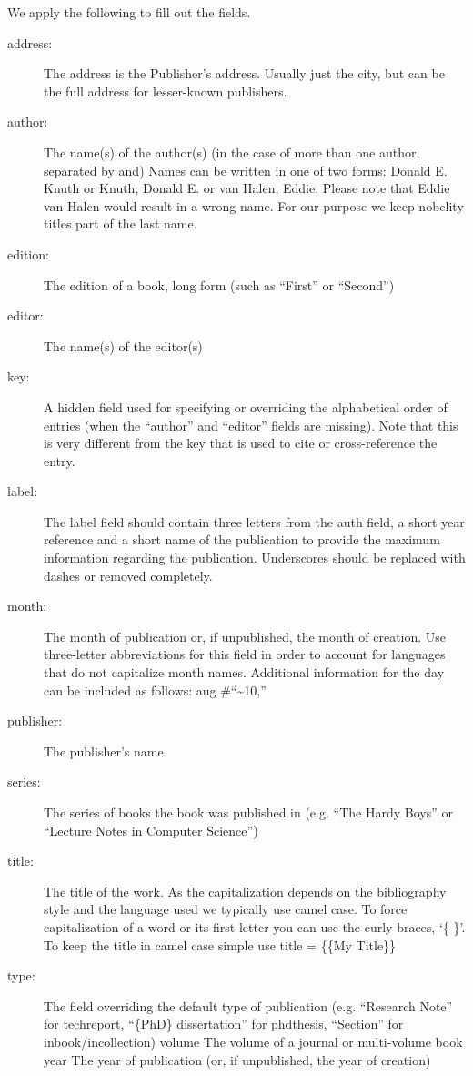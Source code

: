 We apply the following to fill out the fields.

\begin{description}
\item[address:]
The address is the Publisher's address. Usually just the city, but can
be the full address for lesser-known publishers.
\item[author:]
The name(s) of the author(s) (in the case of more than one author,
separated by and) Names can be written in one of two forms: Donald E.
Knuth or Knuth, Donald E. or van Halen, Eddie. Please note that Eddie
van Halen would result in a wrong name. For our purpose we keep nobelity
titles part of the last name.
\item[edition:]
The edition of a book, long form (such as ``First'' or ``Second'')
\item[editor:]
The name(s) of the editor(s)
\item[key:]
A hidden field used for specifying or overriding the alphabetical order
of entries (when the ``author'' and ``editor'' fields are missing). Note
that this is very different from the key that is used to cite or
cross-reference the entry.
\item[label:]
The label field should contain three letters from the auth field, a
short year reference and a short name of the publication to provide the
maximum information regarding the publication. Underscores should be
replaced with dashes or removed completely.
\item[month:]
The month of publication or, if unpublished, the month of creation. Use
three-letter abbreviations for this field in order to account for
languages that do not capitalize month names. Additional information for
the day can be included as follows: aug \#``\textasciitilde{}10,''
\item[publisher:]
The publisher's name
\item[series:]
The series of books the book was published in (e.g. ``The Hardy Boys''
or ``Lecture Notes in Computer Science'')
\item[title:]
The title of the work. As the capitalization depends on the bibliography
style and the language used we typically use camel case. To force
capitalization of a word or its first letter you can use the curly
braces, `\{ \}'. To keep the title in camel case simple use title =
\{\{My Title\}\}
\item[type:]
The field overriding the default type of publication (e.g. ``Research
Note'' for techreport, ``\{PhD\} dissertation'' for phdthesis,
``Section'' for inbook/incollection) volume The volume of a journal or
multi-volume book year The year of publication (or, if unpublished, the
year of creation)
\end{description}

